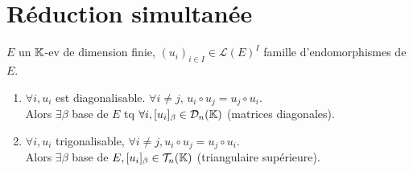 \section{Réduction simultanée}

\begin{theoreme}{}{}
    $E$ un $\mathbb{K}$-ev de dimension finie, $(u_i)_{i \in I} \in \mathscr L(E)^I$ famille d'endomorphismes de $E$.
    \begin{enumerate}
        \item $\forall i, u_i$ est diagonalisable. $\forall i \neq j, \, u_i \circ u_j = u_j \circ u_i$. \\
        Alors $\exists \beta$ base de $E$ tq $\forall i, [u_i]_\beta \in \mathcal D_n(\mathbb{K})$ (matrices diagonales).
        \item $\forall i, u_i$ trigonalisable, $\forall i \neq j, u_i \circ u_j = u_j \circ u_i$. \\
        Alors $\exists \beta$ base de $E, [u_i]_\beta \in \mathcal T_n(\mathbb{K})$ (triangulaire supérieure).
    \end{enumerate}
\end{theoreme}

